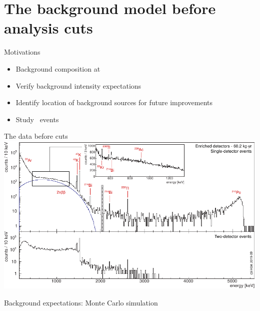 \documentclass[10pt,aspectratio=169]{beamer}
\newcommand{\doi}[1]{\href{https://doi.org/#1}{\smaller\ttfamily #1}}
\begin{document}
\section{The background model before analysis cuts}
\begin{frame}{Motivations}
  \begin{itemize}
    \item Background composition at \qbb
    \item Verify background intensity expectations
    \item Identify location of background sources for future improvements
    \item Study \nnbb\ events
  \end{itemize}
\end{frame}
\begin{frame}[plain]{The data before cuts}
  \includegraphics[height=0.95\textheight]{plots/bkg/raw/ph2/dataGe-desc.pdf}
\end{frame}
\begin{frame}{Background expectations: Monte Carlo simulation}
  \begin{center}
  \end{center}
\end{frame}
\end{document}
